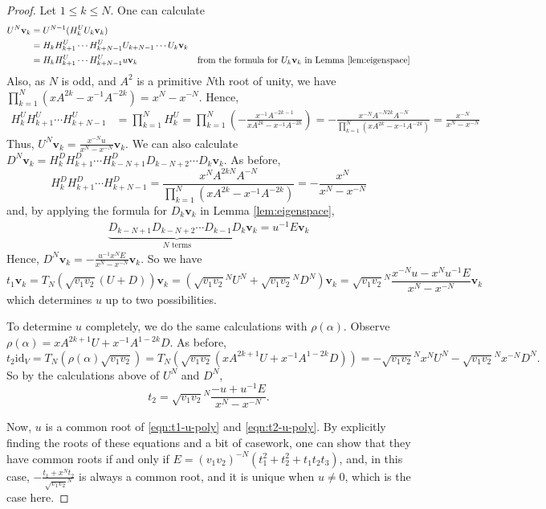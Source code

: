 \documentclass{article}
\newcommand{\id}{\text{id}}
\renewcommand{\v}{\mathbf{v}}
\renewcommand{\a}{\alpha}
\theoremstyle{definition}
\renewcommand{\a}{\alpha}
\begin{document}
\begin{proof}
    Let $1\leq k\leq N$. One can calculate
    \begin{align*}
        U^N\v_k&=U^{N-1}(H_k^UU_k\v_k)&\\
        &=H_kH^U_{k+1}\cdots H^U_{k+N-1}U_{k+N-1}\cdots U_k\v_k&\\
        &=H_kH^U_{k+1}\cdots H^U_{k+N-1}u\v_k &\text{from the formula for $U_k\v_k$ in Lemma \ref{lem:eigenspace}}
    \end{align*}
    Also, as $N$ is odd, and $A^2$ is a primitive $N$th root of unity, we have $\prod_{k=1}^N(xA^{2k}-x^{-1}A^{-2k})=x^N-x^{-N}$. Hence,
    \begin{align*}
        H^U_kH^U_{k+1}\cdots H^U_{k+N-1}&=\prod_{k=1}^NH^U_k
        =\prod_{k=1}^N(-\frac{x^{-1}A^{-2k-1}}{xA^{2k}-x^{-1}A^{-2k}})
        =-\frac{x^{-N}A^{-N2k}A^{-N}}{\prod_{k=1}^N(xA^{2k}-x^{-1}A^{-2k})}
        =\frac{x^{-N}}{x^N-x^{-N}}
    \end{align*}
    Thus, $U^N\v_k=\frac{x^{-N}u}{x^N-x^{-N}}\v_k.$
    We can also calculate $D^N\v_k=H_k^DH_{k+1}^D\cdots H_{k-N+1}^DD_{k-N+2}\cdots D_k\v_k$.
    As before,
    \[
    H_k^DH_{k+1}^D\cdots H_{k+N-1}^D=\frac{x^NA^{2kN}A^{-N}}{\prod_{k=1}^N (xA^{2k}-x^{-1}A^{-2k})}
    =-\frac{x^N}{x^N-x^{-N}}
    \]
    and, by applying the formula for $D_k\v_k$ in Lemma \ref{lem:eigenspace},
    \begin{align*}
        \underbrace{D_{k-N+1}D_{k-N+2}\cdots D_{k-1}D_k}_{N \text{ terms}}\v_k
        =u^{-1}E\v_k
    \end{align*}
    Hence, $D^N\v_k=-\frac{u^{-1}x^NE}{x^N-x^{-N}}\v_k$.
    So we have
    \begin{equation}\label{eqn:t1-u-poly}
     t_1\v_k=T_N(\sqrt{v_1v_2}(U+D))\v_k
    =(\sqrt{v_1v_2}^{N}U^N+\sqrt{v_1v_2}^{N}D^N)\v_k
    =\sqrt{v_1v_2}^{N}\frac{x^{-N}u-x^Nu^{-1}E}{x^N-x^{-N}}\v_k
    \end{equation}
    which determines $u$ up to two possibilities.

    To determine $u$ completely, we do the same calculations with $\rho(\a)$. Observe $\rho(\a)=xA^{2k+1}U+x^{-1}A^{1-2k}D$. As before,
    \[
    t_2\id_V=T_N(\rho(\a)\sqrt{v_1v_2})=T_N(\sqrt{v_1v_2}(xA^{2k+1}U+x^{-1}A^{1-2k}D))=-\sqrt{v_1v_2}^{N}x^NU^N-\sqrt{v_1v_2}^{N}x^{-N}D^N.
    \]
    So by the calculations above of $U^N$ and $D^N$,
    \begin{equation}\label{eqn:t2-u-poly}
    t_2=\sqrt{v_1v_2}^{N}\frac{-u+u^{-1}E}{x^N-x^{-N}}.
    \end{equation}
    
    Now, $u$ is a common root of \eqref{eqn:t1-u-poly} and \eqref{eqn:t2-u-poly}. By explicitly finding the roots of these equations and a bit of casework, one can show that they have common roots if and only if $E=(v_1v_2)^{-N}(t_1^2+t_2^2+t_1t_2t_3)$, and, in this case, $-\frac{t_1+x^Nt_2}{\sqrt{v_1v_2}^{N}}$  is always a common root, and it is unique when $u\neq0$, which is the case here.
\end{proof}
\end{document}
